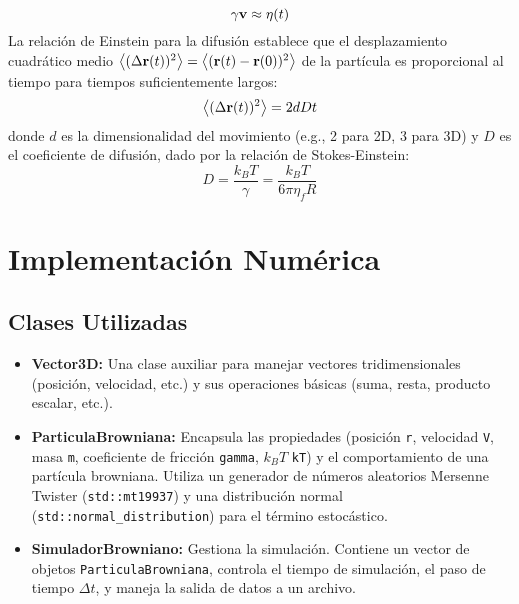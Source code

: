 \documentclass[11pt,a4paper]{article}
\begin{document}
\begin{equation}
    \gamma\vb{v} \approx \vb{\eta}(t)
\end{equation}
La relación de Einstein para la difusión establece que el desplazamiento cuadrático medio $\expval{(\Delta\vb{r}(t))^2} = \expval{(\vb{r}(t) - \vb{r}(0))^2}$ de la partícula es proporcional al tiempo para tiempos suficientemente largos:
\begin{equation}
    \expval{(\Delta\vb{r}(t))^2} = 2dDt
    \label{eq:difusion_einstein_informe}
\end{equation}
donde $d$ es la dimensionalidad del movimiento (e.g., 2 para 2D, 3 para 3D) y $D$ es el coeficiente de difusión, dado por la relación de Stokes-Einstein:
\begin{equation}
    D = \frac{k_B T}{\gamma} = \frac{k_B T}{6\pi\eta_f R}
    \label{eq:stokes_einstein}
\end{equation}

\section{Implementación Numérica}
\subsection{Clases Utilizadas}
\begin{itemize}
    \item \textbf{Vector3D:} Una clase auxiliar para manejar vectores tridimensionales (posición, velocidad, etc.) y sus operaciones básicas (suma, resta, producto escalar, etc.).
    \item \textbf{ParticulaBrowniana:} Encapsula las propiedades (posición \texttt{r}, velocidad \texttt{V}, masa \texttt{m}, coeficiente de fricción \texttt{gamma}, $k_B T$ \texttt{kT}) y el comportamiento de una partícula browniana. Utiliza un generador de números aleatorios Mersenne Twister (\texttt{std::mt19937}) y una distribución normal (\texttt{std::normal\_distribution}) para el término estocástico.
    \item \textbf{SimuladorBrowniano:} Gestiona la simulación. Contiene un vector de objetos \texttt{ParticulaBrowniana}, controla el tiempo de simulación, el paso de tiempo $\Delta t$, y maneja la salida de datos a un archivo.
\end{itemize}
\end{document}
